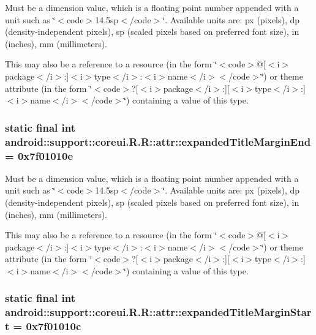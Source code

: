 Must be a dimension value, which is a floating point number appended with a unit such as \char`\"{}$<$code$>$14.5sp$<$/code$>$\char`\"{}. Available units are: px (pixels), dp (density-independent pixels), sp (scaled pixels based on preferred font size), in (inches), mm (millimeters). 

This may also be a reference to a resource (in the form \char`\"{}$<$code$>$@\mbox{[}$<$i$>$package$<$/i$>$:\mbox{]}$<$i$>$type$<$/i$>$:$<$i$>$name$<$/i$>$$<$/code$>$\char`\"{}) or theme attribute (in the form \char`\"{}$<$code$>$?\mbox{[}$<$i$>$package$<$/i$>$:\mbox{]}\mbox{[}$<$i$>$type$<$/i$>$:\mbox{]}$<$i$>$name$<$/i$>$$<$/code$>$\char`\"{}) containing a value of this type. \hypertarget{classandroid_1_1support_1_1coreui_1_1_r_1_1attr_2a21b493181c798cc972413141ad34df}{
\subsubsection[{expandedTitleMarginEnd}]{\setlength{\rightskip}{0pt plus 5cm}static final int android::support::coreui.R.R::attr::expandedTitleMarginEnd = 0x7f01010e}}
\label{classandroid_1_1support_1_1coreui_1_1_r_1_1attr_2a21b493181c798cc972413141ad34df}


Must be a dimension value, which is a floating point number appended with a unit such as \char`\"{}$<$code$>$14.5sp$<$/code$>$\char`\"{}. Available units are: px (pixels), dp (density-independent pixels), sp (scaled pixels based on preferred font size), in (inches), mm (millimeters). 

This may also be a reference to a resource (in the form \char`\"{}$<$code$>$@\mbox{[}$<$i$>$package$<$/i$>$:\mbox{]}$<$i$>$type$<$/i$>$:$<$i$>$name$<$/i$>$$<$/code$>$\char`\"{}) or theme attribute (in the form \char`\"{}$<$code$>$?\mbox{[}$<$i$>$package$<$/i$>$:\mbox{]}\mbox{[}$<$i$>$type$<$/i$>$:\mbox{]}$<$i$>$name$<$/i$>$$<$/code$>$\char`\"{}) containing a value of this type. \hypertarget{classandroid_1_1support_1_1coreui_1_1_r_1_1attr_3c468bb7ac94ac9da7164be4fce88b80}{
\subsubsection[{expandedTitleMarginStart}]{\setlength{\rightskip}{0pt plus 5cm}static final int android::support::coreui.R.R::attr::expandedTitleMarginStart = 0x7f01010c}}
\label{classandroid_1_1support_1_1coreui_1_1_r_1_1attr_3c468bb7ac94ac9da7164be4fce88b80}


